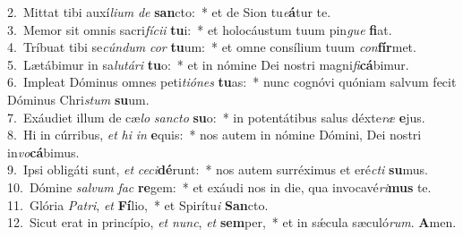 {2.~}Mittat tibi auxí\textit{li}\textit{um} \textit{de} \textbf{san}cto:~* et de Sion tu\textit{e}\textbf{á}tur te.\\
{3.~}Memor sit omnis sacri\textit{fí}\textit{ci}\textit{i} \textbf{tu}i:~* et holocáustum tuum pin\textit{gue} \textbf{fi}at.\\
{4.~}Tríbuat tibi se\textit{cún}\textit{dum} \textit{cor} \textbf{tu}um:~* et omne consílium tuum \textit{con}\textbf{fír}met.\\
{5.~}Lætábimur in sa\textit{lu}\textit{tá}\textit{ri} \textbf{tu}o:~* et in nómine Dei nostri magni\textit{fi}\textbf{cá}bimur.\\
{6.~}Impleat Dóminus omnes peti\textit{ti}\textit{ó}\textit{nes} \textbf{tu}as:~* nunc cognóvi quóniam salvum fecit Dóminus Chri\textit{stum} \textbf{su}um.\\
{7.~}Exáudiet illum de cæ\textit{lo} \textit{san}\textit{cto} \textbf{su}o:~* in potentátibus salus déxte\textit{ræ} \textbf{e}jus.\\
{8.~}Hi in cúrribus, \textit{et} \textit{hi} \textit{in} \textbf{e}quis:~* nos autem in nómine Dómini, Dei nostri in\textit{vo}\textbf{cá}bimus.\\
{9.~}Ipsi obligáti sunt, \textit{et} \textit{ce}\textit{ci}\textbf{dé}runt:~* nos autem surréximus et eré\textit{cti} \textbf{su}mus.\\
{10.~}Dómine \textit{sal}\textit{vum} \textit{fac} \textbf{re}gem:~* et exáudi nos in die, qua invocavé\textit{ri}\textbf{mus} te.\\
{11.~}Glória \textit{Pa}\textit{tri}, \textit{et} \textbf{Fí}lio,~* et Spirítu\textit{i} \textbf{San}cto.\\
{12.~}Sicut erat in princípio, \textit{et} \textit{nunc}, \textit{et} \textbf{sem}per,~* et in sǽcula sæculó\textit{rum}. \textbf{A}men.\\
